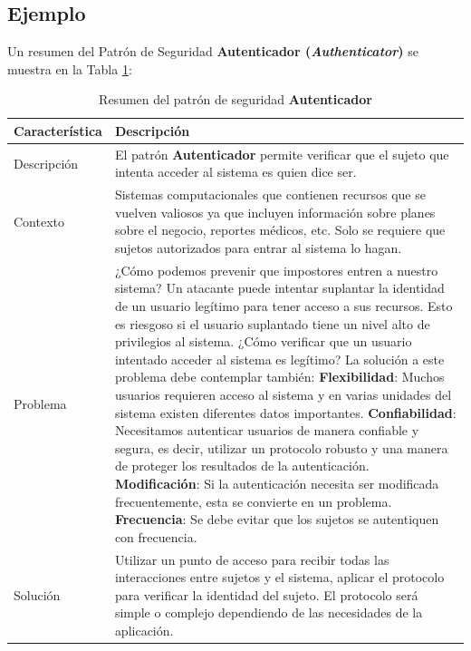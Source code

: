 \subsection*{Ejemplo}

Un resumen del  Patrón de Seguridad \textbf{Autenticador (\textit{Authenticator})} se muestra en la Tabla \ref{resuPat}:

\begin{table}[!ht]
\caption{Resumen del patrón de seguridad \textbf{Autenticador} \cite{Fer13}}
\begin{center}
\scriptsize
\begin{tabular}{|m{3.5cm}|m{10cm}|}
	\hline
	\cellcolor{lightgray}\textbf{Característica} & \cellcolor{lightgray}\textbf{Descripción}\\ \hline
 	Descripción &   El patrón \textbf{Autenticador} permite verificar que el sujeto que intenta acceder al sistema es quien dice ser. \\ \hline

	Contexto &  Sistemas computacionales que contienen recursos que se vuelven valiosos ya que incluyen información sobre planes sobre el negocio, reportes médicos, etc. Solo se requiere que sujetos autorizados para entrar al sistema lo hagan. \\ \hline

	Problema &  ¿Cómo podemos prevenir que impostores entren a nuestro sistema? Un atacante puede intentar suplantar la identidad de un usuario legítimo para tener acceso a sus recursos. Esto es riesgoso si el usuario suplantado tiene un nivel alto de privilegios al sistema. ¿Cómo verificar que un usuario intentado acceder al sistema es legítimo? \newline
La solución a este problema debe contemplar también:\newline
\textbf{Flexibilidad}: Muchos usuarios requieren acceso al sistema y en varias unidades del sistema existen diferentes datos importantes.\newline 
\textbf{Confiabilidad}: Necesitamos autenticar usuarios de manera confiable y segura, es decir, utilizar un protocolo robusto y una manera de proteger los resultados de la autenticación.\newline
\textbf{Modificación}: Si la autenticación necesita ser modificada frecuentemente, esta se convierte en un problema. \newline
\textbf{Frecuencia}: Se debe evitar que los sujetos se autentiquen con frecuencia. 
\\ \hline

	Solución &  Utilizar un punto de acceso para recibir todas las interacciones entre sujetos y el sistema, aplicar el protocolo para  verificar la identidad del sujeto. El protocolo será simple o complejo dependiendo de las necesidades de la aplicación.\\ \hline
\end{tabular}
\label{resuPat}
\end{center}
\end{table}

